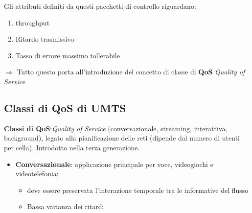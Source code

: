 \documentclass{article}
\begin{document}
Gli attributi definiti da questi pacchetti di controllo riguardano:

\begin{enumerate}
    \item throughput
    \item Ritardo trasmissivo
    \item Tasso di errore massimo tollerabile
\end{enumerate}

$\Rightarrow$ Tutto questo porta all'introduzione del concetto di classe  di \textbf{QoS} \textit{Quality of Service}
\begin{samepage}
    \subsection{Classi di QoS di UMTS}
    \textbf{Classi di QoS}:\@\textit{Quality of Service} (conversazionale, streaming, interattiva, background), legato alla pianificazione delle reti (dipende dal numero di utenti per cella). Introdotto nella terza generazione.
    \begin{itemize}
        \item \textbf{Conversazionale}: applicazione principale per voce, videogiochi e videotelefonia;
            \begin{itemize}
                \item deve essere preservata l'interazione temporale tra le informative del flusso
                \item Bassa varianza dei ritardi

                    \begin{figure}[h]
                        \centering



\end{figure}
\end{itemize}
\end{itemize}
\end{samepage}
\end{document}
